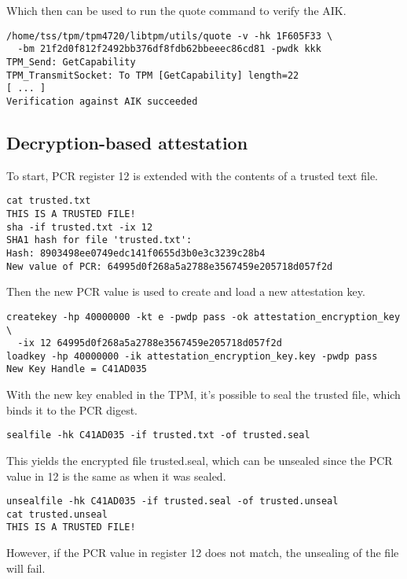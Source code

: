 \documentclass[10pt]{article}
\begin{document}
    Which then can be used to run the quote command to verify the AIK.

\begin{verbatim}
/home/tss/tpm/tpm4720/libtpm/utils/quote -v -hk 1F605F33 \
  -bm 21f2d0f812f2492bb376df8fdb62bbeeec86cd81 -pwdk kkk
TPM_Send: GetCapability
TPM_TransmitSocket: To TPM [GetCapability] length=22
[ ... ]
Verification against AIK succeeded
\end{verbatim}

  \subsection{Decryption-based attestation}

    To start, PCR register 12 is extended with the contents of a trusted text
    file.

\begin{verbatim}
cat trusted.txt
THIS IS A TRUSTED FILE!
sha -if trusted.txt -ix 12
SHA1 hash for file 'trusted.txt':
Hash: 8903498ee0749edc141f0655d3b0e3c3239c28b4
New value of PCR: 64995d0f268a5a2788e3567459e205718d057f2d
\end{verbatim}

    Then the new PCR value is used to create and load  a new attestation key.

\begin{verbatim}
createkey -hp 40000000 -kt e -pwdp pass -ok attestation_encryption_key \
  -ix 12 64995d0f268a5a2788e3567459e205718d057f2d
loadkey -hp 40000000 -ik attestation_encryption_key.key -pwdp pass
New Key Handle = C41AD035
\end{verbatim}

    With the new key enabled in the TPM, it's possible to seal the trusted
    file, which binds it to the PCR digest.

\begin{verbatim}
sealfile -hk C41AD035 -if trusted.txt -of trusted.seal
\end{verbatim}

    This yields the encrypted file trusted.seal, which can be unsealed since
    the PCR value in 12 is the same as when it was sealed.

\begin{verbatim}
unsealfile -hk C41AD035 -if trusted.seal -of trusted.unseal
cat trusted.unseal
THIS IS A TRUSTED FILE!
\end{verbatim}

    However, if the PCR value in register 12 does not match, the unsealing of
    the file will fail.
\end{document}
